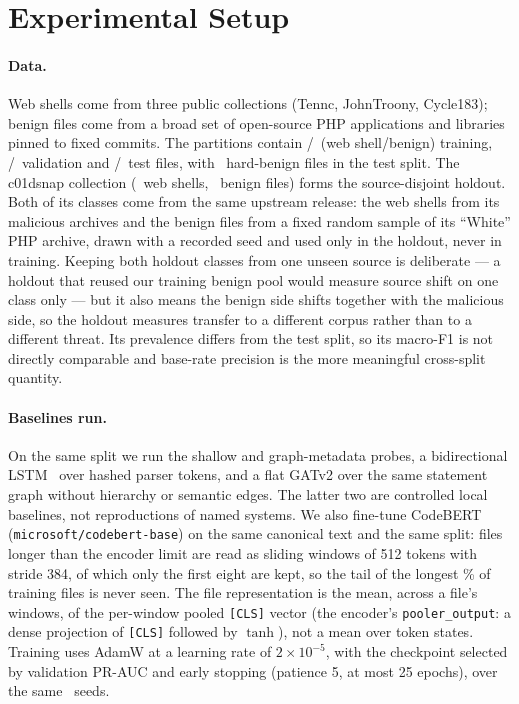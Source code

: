 \documentclass[pdflatex,sn-mathphys-num]{sn-jnl}
\begin{document}
\section{Experimental Setup}\label{sec:setup}
\paragraph{Data.} Web shells come from three public collections (Tennc,
JohnTroony, Cycle183); benign files come from a broad set of open-source PHP
applications and libraries pinned to fixed commits. The partitions contain
\NTrainPos/\NTrainNeg\ (web shell/benign) training, \NValPos/\NValNeg\
validation and \NTestPos/\NTestNeg\ test files, with \NHardBenignTest\
hard-benign files in the test split. The c01dsnap collection (\NHoldoutPos\ web
shells, \NHoldoutNeg\ benign files) forms the source-disjoint holdout. Both of
its classes come from the same upstream release: the web shells from its
malicious archives and the benign files from a fixed random sample of its
``White'' PHP archive, drawn with a recorded seed and used only in the holdout,
never in training. Keeping both holdout classes from one unseen source is
deliberate --- a holdout that reused our training benign pool would measure
source shift on one class only --- but it also means the benign side shifts
together with the malicious side, so the holdout measures transfer to a
different corpus rather than to a different threat. Its
prevalence differs from the test split, so its macro-F1 is not directly
comparable and base-rate precision is the more meaningful cross-split quantity.

\paragraph{Baselines run.} On the same split we run the shallow and
graph-metadata probes, a bidirectional LSTM~\cite{hochreiter1997lstm} over
hashed parser tokens, and a flat GATv2 over the same statement graph without
hierarchy or semantic edges. The latter two are controlled local baselines,
not reproductions of named systems. We also fine-tune
CodeBERT~\cite{feng2020codebert} (\texttt{microsoft/codebert-base}) on the same
canonical text and the same split: files longer than the encoder limit are read
as sliding windows of 512 tokens with stride 384, of which only the first eight
are kept, so the tail of the longest \CodeBertTruncatedTrainPct\% of training
files is never seen. The file representation is the mean, across a file's
windows, of the per-window pooled \texttt{[CLS]} vector (the encoder's
\texttt{pooler\_output}: a dense projection of \texttt{[CLS]} followed by
$\tanh$), not a mean over token states. Training uses AdamW at a
learning rate of $2\times10^{-5}$, with the checkpoint selected by validation
PR-AUC and early stopping (patience 5, at most 25 epochs), over the same
\RqOneSeeds\ seeds.
\end{document}
